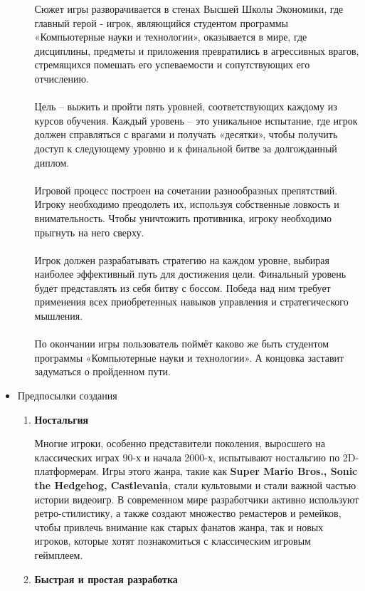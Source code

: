\documentclass{article}
\begin{document}
\begin{itemize}
    \begin{enumerate}
    Сюжет игры разворачивается в стенах Высшей Школы Экономики, где главный герой - игрок, являющийся студентом программы «Компьютерные науки и технологии», оказывается в мире, где дисциплины, предметы и приложения превратились в агрессивных врагов, стремящихся помешать его успеваемости и сопутствующих его отчислению.\\  
    \\Цель – выжить и пройти пять уровней, соответствующих каждому из курсов обучения. Каждый уровень – это уникальное испытание, где игрок должен справляться с врагами и получать «десятки», чтобы получить доступ к следующему уровню и к финальной битве за долгожданный диплом.\\
    \\Игровой процесс построен на сочетании разнообразных препятствий. Игроку необходимо преодолеть их, используя собственные ловкость и внимательность. Чтобы уничтожить противника, игроку необходимо прыгнуть на него сверху.\\
    \\Игрок должен разрабатывать стратегию на каждом уровне, выбирая наиболее эффективный путь для достижения цели. Финальный уровень будет представлять из себя битву с боссом. Победа над ним требует применения всех приобретенных навыков управления и стратегического мышления.\\
    \\По окончании игры пользователь поймёт каково же быть студентом программы «Компьютерные науки и технологии». А концовка заставит задуматься о пройденном пути.
    \end{enumerate}
    \item Предпосылки создания
    \begin{enumerate}
    \item \textbf{Ностальгия} \par
    Многие игроки, особенно представители поколения, выросшего на классических играх 90-х и начала 2000-х, испытывают ностальгию по 2D-платформерам. Игры этого жанра, такие как \textbf{Super Mario Bros., Sonic the Hedgehog, Castlevania}, стали культовыми и стали важной частью истории видеоигр. В современном мире разработчики активно используют ретро-стилистику, а также создают множество ремастеров и ремейков, чтобы привлечь внимание как старых фанатов жанра, так и новых игроков, которые хотят познакомиться с классическим игровым геймплеем.
    \item\textbf{Быстрая и простая разработка} \par

\end{enumerate}
\end{itemize}
\end{document}
